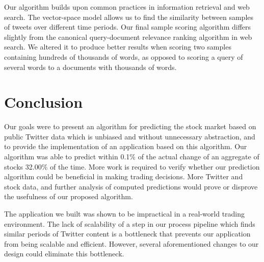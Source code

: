 \documentclass[twocolumn]{article}
\begin{document}
Our algorithm builds upon common practices in information retrieval and web search. The vector-space model allows us to find the similarity between samples of tweets over different time periods. Our final sample scoring algorithm differs slightly from the canonical query-document relevance ranking algorithm in web search. We altered it to produce better results when scoring two samples containing hundreds of thousands of words, as opposed to scoring a query of several words to a documents with thousands of words.

\section{Conclusion}
Our goals were to present an algorithm for predicting the stock market based on public Twitter data which is unbiased and without unnecessary abstraction, and to provide the implementation of an application based on this algorithm. Our algorithm was able to predict within 0.1\% of the actual change of an aggregate of stocks 32.00\% of the time. More work is required to verify whether our prediction algorithm could be beneficial in making trading decisions. More Twitter and stock data, and further analysis of computed predictions would prove or disprove the usefulness of our proposed algorithm.

The application we built was shown to be impractical in a real-world trading environment. The lack of scalability of a step in our process pipeline which finds similar periods of Twitter content is a bottleneck that prevents our application from being scalable and efficient. However, several aforementioned changes to our design could eliminate this bottleneck.



\end{document}
